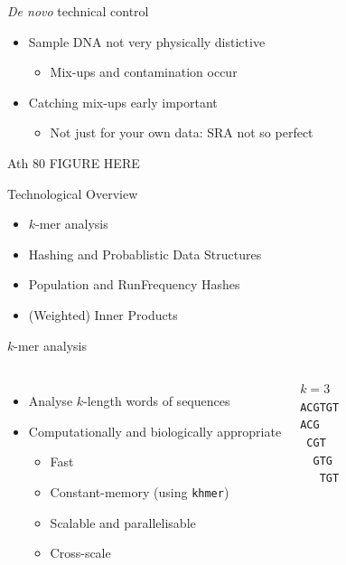 \documentclass[t]{beamer}
\begin{document}
\begin{frame}{\textit{De novo} technical control}
  \begin{itemize}
    \item Sample DNA not very physically distictive
      \begin{itemize}
        \item Mix-ups and contamination occur
      \end{itemize}
    \item Catching mix-ups early important
      \begin{itemize}
        \item Not just for your own data: SRA not so perfect
      \end{itemize}
  \end{itemize}
  Ath 80 FIGURE HERE %
\end{frame}

\begin{frame}{Technological Overview}
  \begin{itemize}
    \item $k$-mer analysis
    \item Hashing and Probablistic Data Structures
    \item Population and RunFrequency Hashes
    \item (Weighted) Inner Products
  \end{itemize}
\end{frame}

\begin{frame}{$k$-mer analysis}
  \begin{columns}[t]
      \begin{itemize}
        \item<1-> Analyse $k$-length words of sequences
        \item<2> Computationally and biologically appropriate
        \begin{itemize}
          \item<2> Fast
          \item<2> Constant-memory (using \texttt{khmer})
          \item<2> Scalable and parallelisable
          \item<2> Cross-scale
        \end{itemize}
      \end{itemize}
      \vfill
    $k = 3$\\
    \texttt{ACGTGT}\\
    \texttt{ACG~~~}\\
    \texttt{~CGT~~}\\
    \texttt{~~GTG~}\\
    \texttt{~~~TGT}
  \end{columns}
\end{frame}
\end{document}
